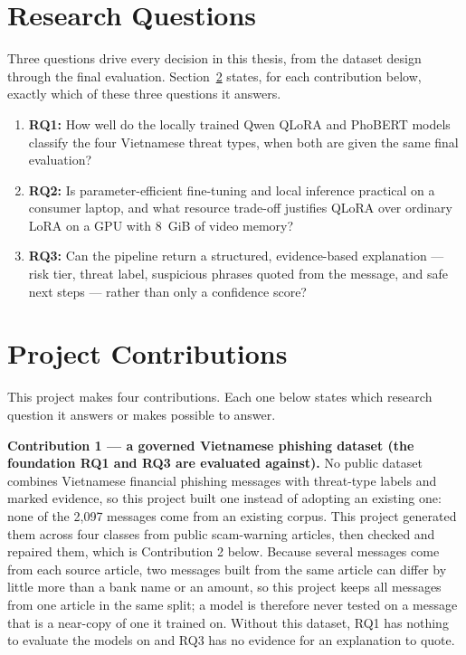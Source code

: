 \section{Research Questions}
Three questions drive every decision in this thesis, from the dataset design through the final evaluation. Section~\ref{sec:contributions-map} states, for each contribution below, exactly which of these three questions it answers.

\begin{enumerate}
\item \textbf{RQ1:} How well do the locally trained Qwen QLoRA and PhoBERT models classify the four Vietnamese threat types, when both are given the same final evaluation?

\item \textbf{RQ2:} Is parameter-efficient fine-tuning and local inference practical on a consumer laptop, and what resource trade-off justifies QLoRA over ordinary LoRA on a GPU with 8~GiB of video memory?

\item \textbf{RQ3:} Can the pipeline return a structured, evidence-based explanation --- risk tier, threat label, suspicious phrases quoted from the message, and safe next steps --- rather than only a confidence score?
\end{enumerate}

\section{Project Contributions}
\label{sec:contributions-map}
This project makes four contributions. Each one below states which research question it answers or makes possible to answer.

\textbf{Contribution 1 --- a governed Vietnamese phishing dataset (the foundation RQ1 and RQ3 are evaluated against).} No public dataset combines Vietnamese financial phishing messages with threat-type labels and marked evidence, so this project built one instead of adopting an existing one: none of the 2{,}097 messages come from an existing corpus. This project generated them across four classes from public scam-warning articles, then checked and repaired them, which is Contribution 2 below. Because several messages come from each source article, two messages built from the same article can differ by little more than a bank name or an amount, so this project keeps all messages from one article in the same split; a model is therefore never tested on a message that is a near-copy of one it trained on. Without this dataset, RQ1 has nothing to evaluate the models on and RQ3 has no evidence for an explanation to quote.

